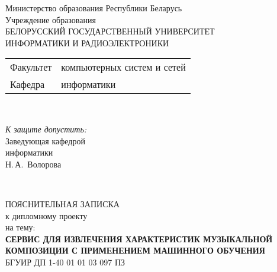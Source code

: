 \begin{titlepage}
  \begin{center}
    Министерство образования Республики Беларусь\\[1em]
    Учреждение образования\\
    БЕЛОРУССКИЙ ГОСУДАРСТВЕННЫЙ УНИВЕРСИТЕТ \\
    ИНФОРМАТИКИ И РАДИОЭЛЕКТРОНИКИ\\[1em]

    \begin{minipage}{\textwidth}
      \begin{flushleft}
        \begin{tabular}{ l l }
          Факультет & компьютерных систем и сетей\\
          Кафедра   & информатики
        \end{tabular}
      \end{flushleft}
    \end{minipage}\\[1em]

    \begin{flushright}
      \begin{minipage}{0.4\textwidth}
        \textit{К защите допустить:}\\[0.8em]
        Заведующая кафедрой\\ информатики\\[0.45em]
        \underline{\hspace*{2.8cm}} Н.\,А.~Волорова
      \end{minipage}\\[2.2em]
    \end{flushright}

    {ПОЯСНИТЕЛЬНАЯ ЗАПИСКА}\\
    {к дипломному проекту}\\
    {на тему:}\\[1em]
    \textbf{\large СЕРВИС ДЛЯ ИЗВЛЕЧЕНИЯ ХАРАКТЕРИСТИК МУЗЫКАЛЬНОЙ КОМПОЗИЦИИ С ПРИМЕНЕНИЕМ МАШИННОГО ОБУЧЕНИЯ}\\[1em]


    {БГУИР ДП 1-40 01 01 03 097 ПЗ}\\[2em]


\end{center}
\end{titlepage}
